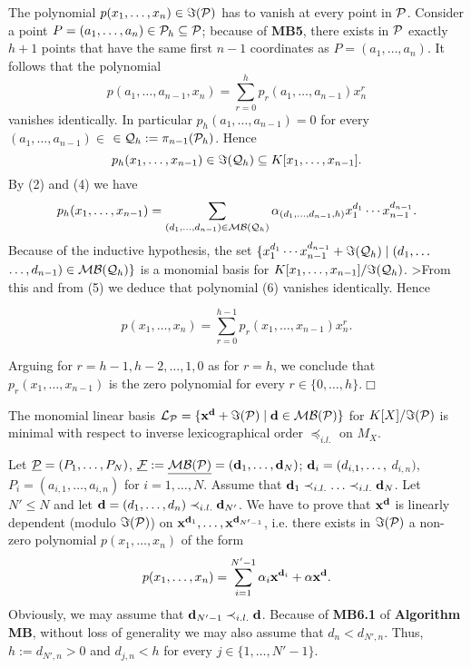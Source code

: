 The polynomial $p(x_1,\ldots,x_n)\in \Im({\cal P})$ 
has to vanish at every point in
${\cal P}$. Consider a point $P=(a_1,\ldots, a_n)\in {\cal
P}_h\subseteq {\cal P}$; because of {\bf MB5}, there exists in ${\cal P}$ 
exactly $h+1$
points that have the same first $n-1$ coordinates as
$P=(a_1,\ldots, a_n)$. It follows that the polynomial
$$
p(a_1,\ldots,a_{n-1},x_n)=\sum_{r=0}^h p_r(a_1,\ldots,a_{n-1})x_n^r
$$
vanishes identically. In particular $p_h(a_1,\ldots,a_{n-1})=0$
for every $(a_1,\ldots,a_{n-1})\in$ $\in {\cal Q}_h:=\pi_{n-1}({\cal
P}_h)$. Hence
\begin{equation}
p_h(x_1,\ldots,x_{n-1})\in \Im({\cal Q}_h)\subseteq
K[x_1,\ldots,x_{n-1}].
\end{equation}
By (2) and (4) we have
\begin{equation}
p_h(x_1,\ldots,x_{n-1})=
\sum_{(d_1,\ldots,d_{n-1})\in {\cal MB}({\cal Q}_h)}
\alpha_{(d_1,\ldots,d_{n-1},h)} x_1^{d_1}\cdots x_{n-1}^{d_{n-1}}.
\end{equation}
Because of the inductive hypothesis, the set
$\{x_1^{d_1}\cdots x_{n-1}^{d_{n-1}} + \Im({\cal Q}_h)\mid
(d_1,\ldots$ $\ldots, d_{n-1})\in {\cal MB}({\cal Q}_h)\}$
is a monomial basis for $K[x_1,\ldots, x_{n-1}]/\Im({\cal Q}_h)$.
>From this and from (5) we deduce that polynomial (6) vanishes
identically. Hence

\begin{equation}
p(x_1,\ldots,x_n)=\sum_{r=0}^{h-1} p_r(x_1,\ldots,x_{n-1})x_n^r.
\end{equation}

Arguing for $r=h-1, h-2,\ldots, 1,0$ as for $r=h$, we conclude
that $p_r(x_1,\ldots,x_{n-1})$ is the zero polynomial for every
$r\in \{0,\ldots,h\}$.\hfill $\Box$

\begin{prop}
The  monomial linear basis
${\cal L}_{\cal  P}=\{{\bf x^d}+\Im({\cal P}) \mid {\bf d}\in 
{\cal MB(P)}\}$  for $K[X]/\Im({\cal P})$ 
is minimal with respect to inverse lexicographical order 
$\preceq_{i.l.}$ on $M_X$.
\end{prop}
\prova
Let $\underline{\cal P}=(P_1,\ldots,P_N)$, 
$\underline{\cal F}:=\underline{\cal MB(P)}=({\bf d}_1,\ldots,{\bf d}_N)$; 
${\bf d}_i = (d_{i,1},\ldots,$ $ d_{i,n})$, 
$P_i=(a_{i,1},\ldots,a_{i,n})$ for $i = 1,\dots,N$.
Assume that ${\bf d}_1\prec_{i.l.}\ldots\prec_{i.l.}{\bf d}_N$. 
Let $N'\leq N$ and let ${\bf d} = 
(d_{1},\ldots,d_{n})\prec_{i.l.}{\bf d}_{N'}$. 
We have to prove that ${\bf x}^{\bf d}$ is linearly dependent 
(modulo $\Im({\cal P})$) on 
${\bf x}^{{\bf d}_1},\ldots,{\bf x}^{{\bf d}_{N'-1}}$, i.e. there 
exists in $\Im({\cal P})$ a non-zero polynomial 
$p(x_1,\ldots,x_n)$ of the form 
\begin{equation}
p(x_1,\ldots,x_n)=
\sum_{i=1}^{N'-1}\alpha_i{\bf x}^{{\bf d}_i}+\alpha {\bf x^d}. 
\end{equation}
Obviously, we may assume that ${\bf d}_{N'-1}\prec_{i.l.}{\bf d}$. 
Because of {\bf MB6.1} of   {\bf Algorithm MB}, 
without loss of generality we may also assume that 
$d_n<d_{N',n}$. Thus, $h:=d_{N',n}>0$ 
and $d_{j,n}<h$ for every $j\in \{1,\ldots,N'-1\}$.


